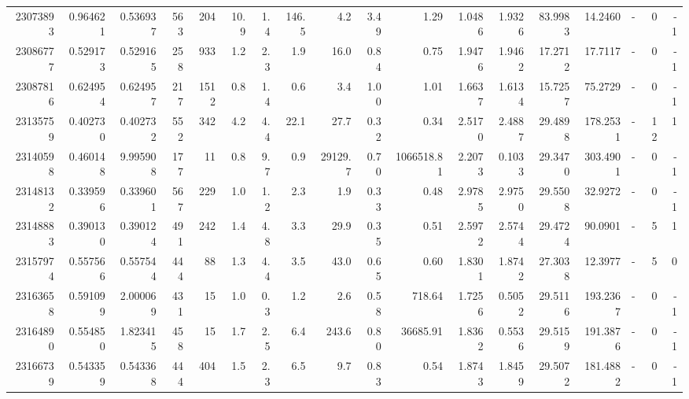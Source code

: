 \begin{tabular}{rrrrrrrrrrrrrrrlrr}
  23073893 & 0.964621 &   0.536937 &  563 &  204 &     10.9 &      1.4 &   146.5 &      4.2 &       3.49 &        1.29 &  1.0486 &  1.9326 &   83.9983 &   14.2460 &             - &        0 &         -1 \\
  23086777 & 0.529173 &   0.529165 &  258 &  933 &      1.2 &      2.3 &     1.9 &     16.0 &       0.84 &        0.75 &  1.9476 &  1.9462 &   17.2712 &   17.7117 &             - &        0 &         -1 \\
  23087816 & 0.624954 &   0.624957 &  217 & 1512 &      0.8 &      1.4 &     0.6 &      3.4 &       1.00 &        1.01 &  1.6637 &  1.6134 &   15.7257 &   75.2729 &             - &        0 &         -1 \\
  23135759 & 0.402730 &   0.402732 &  552 &  342 &      4.2 &      4.4 &    22.1 &     27.7 &       0.32 &        0.34 &  2.5170 &  2.4887 &   29.4898 &  178.2531 &             - &       12 &          1 \\
  23140598 & 0.460148 &   9.995908 &  177 &   11 &      0.8 &      9.7 &     0.9 &  29129.7 &       0.70 &  1066518.81 &  2.2073 &  0.1033 &   29.3470 &  303.4901 &             - &        0 &         -1 \\
  23148132 & 0.339596 &   0.339601 &  567 &  229 &      1.0 &      1.2 &     2.3 &      1.9 &       0.33 &        0.48 &  2.9785 &  2.9750 &   29.5508 &   32.9272 &             - &        0 &         -1 \\
  23148883 & 0.390130 &   0.390124 &  491 &  242 &      1.4 &      4.8 &     3.3 &     29.9 &       0.35 &        0.51 &  2.5972 &  2.5744 &   29.4724 &   90.0901 &             - &        5 &          1 \\
  23157974 & 0.557566 &   0.557544 &  444 &   88 &      1.3 &      4.4 &     3.5 &     43.0 &       0.65 &        0.60 &  1.8301 &  1.8742 &   27.3038 &   12.3977 &             - &        5 &          0 \\
  23163658 & 0.591099 &   2.000069 &  431 &   15 &      1.0 &      0.3 &     1.2 &      2.6 &       0.58 &      718.64 &  1.7256 &  0.5052 &   29.5116 &  193.2367 &             - &        0 &         -1 \\
  23164890 & 0.554850 &   1.823415 &  458 &   15 &      1.7 &      2.5 &     6.4 &    243.6 &       0.80 &    36685.91 &  1.8362 &  0.5536 &   29.5159 &  191.3876 &             - &        0 &         -1 \\
  23166739 & 0.543359 &   0.543368 &  444 &  404 &      1.5 &      2.3 &     6.5 &      9.7 &       0.83 &        0.54 &  1.8743 &  1.8459 &   29.5072 &  181.4882 &             - &        0 &         -1 \\

\end{tabular}
